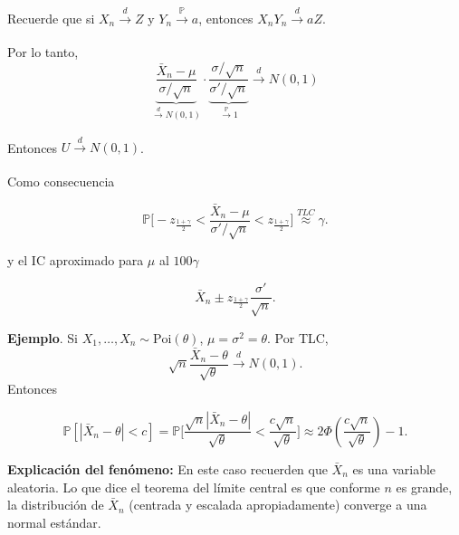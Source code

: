 \documentclass[
  12pt,
]{book}
\begin{document}
Recuerde que si \(X_n\xrightarrow[]{d}Z\) y \(Y_n\xrightarrow[]{\mathbb{P}}a\), entonces
\(X_nY_n \xrightarrow[]{d}aZ\).

Por lo tanto,
\[
\underbrace{\dfrac{\bar X_n-\mu}{\sigma/\sqrt n}}_{\xrightarrow[]{d}
N(0,1)} \cdot \underbrace{\dfrac{\sigma/\sqrt n}{\sigma'/\sqrt n}}_{\xrightarrow[]{\mathbb
P}1} \xrightarrow[]{d}N(0,1)\]

Entonces \(U\xrightarrow[]{d}N(0,1)\).

Como consecuencia

\[
\mathbb P \bigg[-z_{\frac{1+\gamma}2}<\dfrac{\bar X_n-\mu}{\sigma'/\sqrt n}
<z_{\frac{1+\gamma}2}\bigg] \stackrel{TLC}{\approx} \gamma.
\]

y el IC aproximado para \(\mu\) al \(100\gamma\)

\[\bar X_n \pm z_{\frac{1+\gamma}2}\dfrac{\sigma'}{\sqrt n}.\]

\textbf{Ejemplo}. Si \(X_1,\dots, X_n\sim \text{Poi}(\theta)\), \(\mu =\sigma^2 = \theta\). Por TLC,
\[\sqrt n\dfrac{\bar X_n-\theta}{\sqrt{\theta}}\xrightarrow[]{d}N(0,1).\] Entonces

\[
\mathbb P[|\bar X_n-\theta|<c] = \mathbb P\bigg[\dfrac{\sqrt n|\bar X_n-\theta|}{\sqrt \theta}<\dfrac{c\sqrt n}{\sqrt \theta}\bigg] \approx 2\Phi\left(\dfrac{c\sqrt n}{\sqrt \theta}\right)-1.
\]

\textbf{Explicación del fenómeno:} En este caso recuerden que \(\bar{X}_n\) es una
variable aleatoria. Lo que dice el teorema del límite central es que conforme
\(n\) es grande, la distribución de \(\bar{X}_n\) (centrada y escalada
apropiadamente) converge a una normal estándar.
\end{document}
